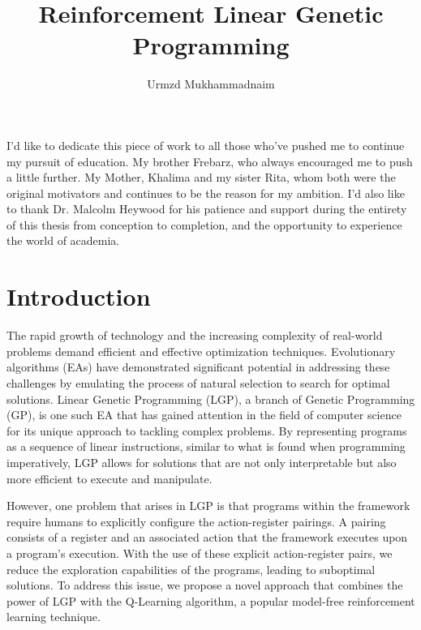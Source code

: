 \documentclass[12pt, final]{dalcsthesis}
\begin{document}
\bcshon
\title{Reinforcement Linear Genetic Programming}
\author{Urmzd Mukhammadnaim}

\reader{}

\nolistoftables
\nolistoffigures

\frontmatter

\nocite{*}

\begin{abstract}
\end{abstract}

\begin{acknowledgements}
	I'd like to dedicate this piece of work to all those who've pushed me to continue my
	pursuit of education. My brother Frebarz, who always encouraged me to push a little further. My Mother, Khalima and my sister Rita, whom both were the original motivators and continues to be the reason for my ambition. I'd also like to thank Dr. Malcolm Heywood for
	his patience and support during the entirety of this thesis from conception to completion, and the opportunity to experience the world of academia.
\end{acknowledgements}

\mainmatter

\chapter{Introduction}
The rapid growth of technology and the increasing complexity of real-world problems demand efficient and effective optimization techniques. Evolutionary algorithms (EAs) have demonstrated significant potential in addressing these challenges by emulating the process of natural selection to search for optimal solutions. Linear Genetic Programming (LGP), a branch of Genetic Programming (GP), is one such EA that has gained attention in the field of computer science for its unique approach to tackling complex problems. By representing programs as a sequence of linear instructions, similar to what is found when programming imperatively, LGP allows for solutions that are not only interpretable but also more efficient to execute and manipulate.

However, one problem that arises in LGP is that programs within the framework require humans to explicitly configure the action-register pairings. A pairing consists of a register and an associated action that the framework executes upon a program's execution. With the use of these explicit action-register pairs, we reduce the exploration capabilities of the programs, leading to suboptimal solutions. To address this issue, we propose a novel approach that combines the power of LGP with the Q-Learning algorithm, a popular model-free reinforcement learning technique.
\end{document}
